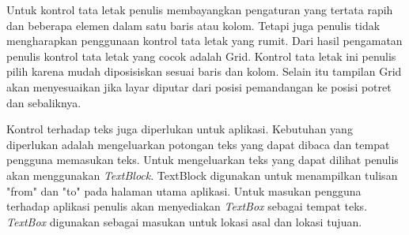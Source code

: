 Untuk kontrol tata letak penulis membayangkan pengaturan yang tertata rapih dan beberapa elemen dalam satu baris atau kolom. Tetapi juga penulis tidak mengharapkan penggunaan kontrol tata letak yang rumit. Dari hasil pengamatan penulis kontrol tata letak yang cocok adalah Grid. Kontrol tata letak ini penulis pilih karena mudah diposisiskan sesuai baris dan kolom. Selain itu tampilan Grid akan menyesuaikan jika layar diputar dari posisi pemandangan ke posisi potret dan sebaliknya.

Kontrol terhadap teks juga diperlukan untuk aplikasi. Kebutuhan yang diperlukan adalah mengeluarkan potongan teks yang dapat dibaca dan tempat pengguna memasukan teks. Untuk mengeluarkan teks yang dapat dilihat penulis akan menggunakan \textit{TextBlock}. TextBlock digunakan untuk menampilkan tulisan "from" dan "to" pada halaman utama aplikasi. Untuk masukan pengguna terhadap aplikasi penulis akan menyediakan \textit{TextBox} sebagai tempat teks. \textit{TextBox} digunakan sebagai masukan untuk lokasi asal dan lokasi tujuan.

